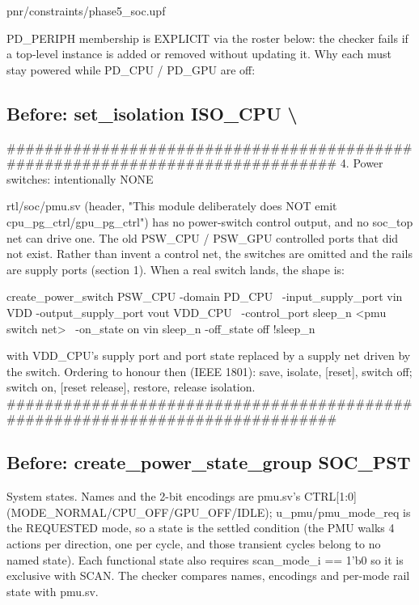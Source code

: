 \begin{relocated}{pnr/constraints/phase5_soc.upf}
\begin{textblock}
PD_PERIPH membership is EXPLICIT via the roster below: the checker fails if
a top-level instance is added or removed without updating it.  Why each must
stay powered while PD_CPU / PD_GPU are off:

\end{textblock}

\subsection*{Before: set\_isolation ISO\_CPU \textbackslash{}}

\begin{textblock}
##############################################################################
4. Power switches: intentionally NONE

rtl/soc/pmu.sv (header, "This module deliberately does NOT emit
cpu_pg_ctrl/gpu_pg_ctrl") has no power-switch control output, and no
soc_top net can drive one.  The old PSW_CPU / PSW_GPU controlled ports that
did not exist.  Rather than invent a control net, the switches are omitted
and the rails are supply ports (section 1).  When a real switch lands, the
shape is:

  create_power_switch PSW_CPU -domain PD_CPU \
      -input_supply_port {vin VDD} -output_supply_port {vout VDD_CPU} \
      -control_port {sleep_n <pmu switch net>} \
      -on_state {on vin {sleep_n}} -off_state {off {!sleep_n}}

with VDD_CPU's supply port and port state replaced by a supply net driven by
the switch.  Ordering to honour then (IEEE 1801): save, isolate, [reset],
switch off; switch on, [reset release], restore, release isolation.
##############################################################################
\end{textblock}

\subsection*{Before: create\_power\_state\_group SOC\_PST}

\begin{textblock}
System states.  Names and the 2-bit encodings are pmu.sv's CTRL[1:0]
(MODE_NORMAL/CPU_OFF/GPU_OFF/IDLE); u_pmu/pmu_mode_req is the REQUESTED mode,
so a state is the settled condition (the PMU walks 4 actions per direction,
one per cycle, and those transient cycles belong to no named state).
Each functional state also requires scan_mode_i == 1'b0 so it is exclusive
with SCAN.  The checker compares names, encodings and per-mode rail state
with pmu.sv.


\end{textblock}
\end{relocated}
